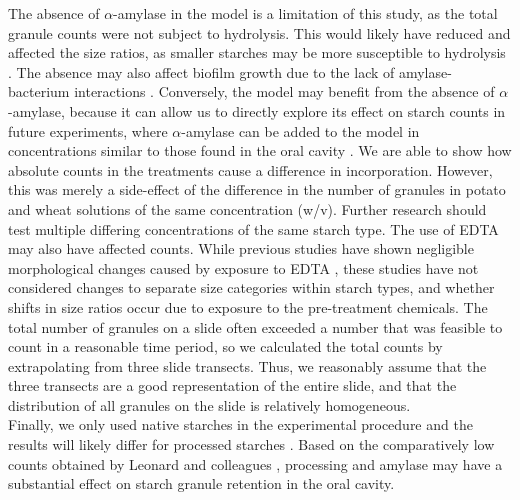 \documentclass[utf8]{../templates/frontiersSCNS}
\begin{document}
The absence of \(\alpha\)-amylase in the model is a limitation of this study, as
the total granule counts were not subject to hydrolysis. This would likely have
reduced and affected the size ratios, as smaller starches may be more
susceptible to hydrolysis
\citep{francoStarchDegradation1992, haslamDecompositionStarch2004}. The absence may
also affect biofilm growth due to the lack of amylase-bacterium interactions
\citep{nikitkovaStarchBiofilms2013}. Conversely, the model may benefit from the
absence of \(\alpha\)-amylase, because it can allow us to directly explore
its effect on starch counts in future experiments, where \(\alpha\)-amylase can be
added to the model in concentrations similar to those found in the oral cavity
\citep{scannapiecoSalivaryAmylase1993}.
We are able to show how absolute counts in the treatments cause a difference in
incorporation. However, this
was merely a side-effect of the difference in the number of granules in potato and
wheat solutions of the same concentration (w/v). Further research should test
multiple differing concentrations of the same starch type.
The use of EDTA may also have affected counts. While previous studies have shown
negligible morphological changes caused by exposure to EDTA
\citep{trompEDTACalculus2017, lemoyneCalculusPretreatments2021, modiCalculusMethodologies2020},
these studies have not considered changes to separate size
categories within starch types, and whether shifts in size ratios occur due to
exposure to the pre-treatment chemicals.
The total number of granules on a slide often exceeded a number that
was feasible to count in a reasonable time period, so we calculated the total
counts by extrapolating from three slide transects.
Thus, we reasonably assume that the three transects are a good representation
of the entire slide, and that the distribution of all granules on the slide is
relatively homogeneous.\\
Finally, we only used native starches in the experimental procedure and the results
will likely differ for processed starches \citep{graneroStarchTaphonomy2020}.
Based on the comparatively low counts obtained by Leonard
and colleagues \citeyearpar[Supplement 2]{leonardPlantMicroremains2015}, processing and amylase
may have a substantial effect on starch granule retention in the oral cavity.
\end{document}
